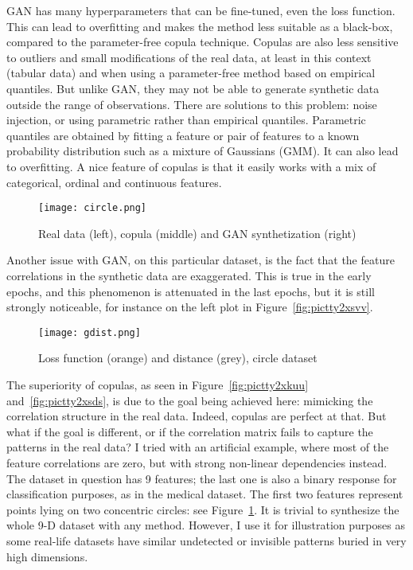 \documentclass[oneside,10pt]{book}
\begin{document}
GAN has  many hyperparameters that can be fine-tuned, even the loss function. This can lead to overfitting and makes the method less suitable as a black-box, compared to the parameter-free copula technique. Copulas are also less sensitive to outliers and small modifications of the real data, at least in this context (tabular data) and when using a parameter-free method based on empirical quantiles. But unlike GAN, they may not be able to generate synthetic data outside the range of observations. 
There are solutions to this problem: noise injection, or using parametric rather than empirical quantiles. Parametric quantiles are obtained by fitting a feature or pair of features to a known probability distribution such as a mixture of Gaussians (GMM). It can also lead to overfitting.
A nice feature of copulas is that it easily works with a mix of categorical, ordinal and continuous features.

\begin{figure}[H]
\centering
\texttt{[image: circle.png]}  
\caption{Real data (left), copula (middle) and GAN synthetization (right)}
\label{fig:pictty2xsuu}
\end{figure}

Another issue with GAN, on this particular dataset, is the fact that the feature correlations in the synthetic data are exaggerated. This is true in the early epochs, and this phenomenon is attenuated in the last epochs, but it is still strongly noticeable, for instance on the left plot in Figure~\ref{fig:pictty2xsvv}.


\begin{figure}[H]
\centering
\texttt{[image: gdist.png]}  
\caption{Loss function (orange) and distance (grey), circle dataset}
\label{fig:pictty2xsvvdd}
\end{figure}

The superiority of copulas, as seen in Figure~\ref{fig:pictty2xkuu} and~\ref{fig:pictty2xsds}, is due to the goal being achieved here: mimicking the correlation structure in the real data. Indeed, copulas are perfect at that. But what if the goal is different, or if the correlation matrix fails to capture the patterns in the real data? I tried with an artificial example, where most of the feature correlations are zero, but with strong non-linear dependencies instead. The dataset in question has 9 features; the last one is also a binary response for classification purposes, as in
 the medical dataset. The first two features represent points lying on two concentric circles: see Figure~\ref{fig:pictty2xsuu}. It is trivial to synthesize the whole 9-D dataset with any method. However, I use it for illustration purposes as some real-life datasets  have 
 similar undetected or invisible patterns buried in very high dimensions.  
\end{document}
